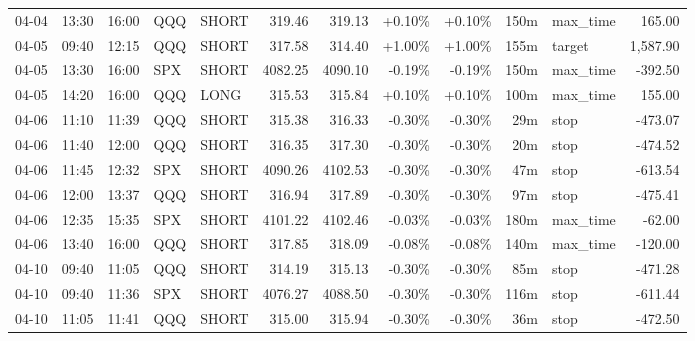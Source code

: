 \documentclass[11pt,a4paper,twoside]{article}
\begin{document}
\begin{center}
\begin{longtable}{>{\color{txtmain}}l l l l l r r r r r >{\color{txtmain}}l r}
04-04 & 13:30 & 16:00 & QQQ & SHORT & 319.46 & 319.13 & \textcolor{wingreen}{+0.10\%} & \textcolor{wingreen}{+0.10\%} & 150m & max\_time & \textcolor{wingreen}{165.00} \\
04-05 & 09:40 & 12:15 & QQQ & SHORT & 317.58 & 314.40 & \textcolor{wingreen}{+1.00\%} & \textcolor{wingreen}{+1.00\%} & 155m & target & \textcolor{wingreen}{1,587.90} \\
04-05 & 13:30 & 16:00 & SPX & SHORT & 4082.25 & 4090.10 & \textcolor{lossred}{-0.19\%} & \textcolor{lossred}{-0.19\%} & 150m & max\_time & \textcolor{lossred}{-392.50} \\
04-05 & 14:20 & 16:00 & QQQ & LONG & 315.53 & 315.84 & \textcolor{wingreen}{+0.10\%} & \textcolor{wingreen}{+0.10\%} & 100m & max\_time & \textcolor{wingreen}{155.00} \\
04-06 & 11:10 & 11:39 & QQQ & SHORT & 315.38 & 316.33 & \textcolor{lossred}{-0.30\%} & \textcolor{lossred}{-0.30\%} & 29m & stop & \textcolor{lossred}{-473.07} \\
04-06 & 11:40 & 12:00 & QQQ & SHORT & 316.35 & 317.30 & \textcolor{lossred}{-0.30\%} & \textcolor{lossred}{-0.30\%} & 20m & stop & \textcolor{lossred}{-474.52} \\
04-06 & 11:45 & 12:32 & SPX & SHORT & 4090.26 & 4102.53 & \textcolor{lossred}{-0.30\%} & \textcolor{lossred}{-0.30\%} & 47m & stop & \textcolor{lossred}{-613.54} \\
04-06 & 12:00 & 13:37 & QQQ & SHORT & 316.94 & 317.89 & \textcolor{lossred}{-0.30\%} & \textcolor{lossred}{-0.30\%} & 97m & stop & \textcolor{lossred}{-475.41} \\
04-06 & 12:35 & 15:35 & SPX & SHORT & 4101.22 & 4102.46 & \textcolor{lossred}{-0.03\%} & \textcolor{lossred}{-0.03\%} & 180m & max\_time & \textcolor{lossred}{-62.00} \\
04-06 & 13:40 & 16:00 & QQQ & SHORT & 317.85 & 318.09 & \textcolor{lossred}{-0.08\%} & \textcolor{lossred}{-0.08\%} & 140m & max\_time & \textcolor{lossred}{-120.00} \\
04-10 & 09:40 & 11:05 & QQQ & SHORT & 314.19 & 315.13 & \textcolor{lossred}{-0.30\%} & \textcolor{lossred}{-0.30\%} & 85m & stop & \textcolor{lossred}{-471.28} \\
04-10 & 09:40 & 11:36 & SPX & SHORT & 4076.27 & 4088.50 & \textcolor{lossred}{-0.30\%} & \textcolor{lossred}{-0.30\%} & 116m & stop & \textcolor{lossred}{-611.44} \\
04-10 & 11:05 & 11:41 & QQQ & SHORT & 315.00 & 315.94 & \textcolor{lossred}{-0.30\%} & \textcolor{lossred}{-0.30\%} & 36m & stop & \textcolor{lossred}{-472.50} \\

\end{longtable}
\end{center}
\end{document}

